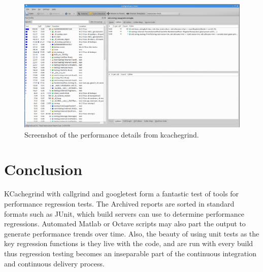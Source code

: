 \documentclass[12pt,journal]{article}
\begin{document}


\begin{figure}
    \centering
    \includegraphics[width=0.8\columnwidth]{kcachegrind.png}
    \caption{Screenshot of the performance details from kcachegrind.}
    \label{fig:kcachegrind}
\end{figure}

\section{Conclusion}
KCachegrind with callgrind and googletest form a fantastic test of tools for
performance regression tests. The Archived reports are sorted in standard
formats such as JUnit, which build servers can use to determine performance
regressions. Automated Matlab or Octave scripts may also part the output to
generate performance trends over time. Also, the beauty of using unit tests as
the key regression functions is they live with the code, and are run with every
build thus regression testing becomes an inseparable part of the continuous
integration and continuous delivery process.

\clearpage
\printbibliography
\end{document}
